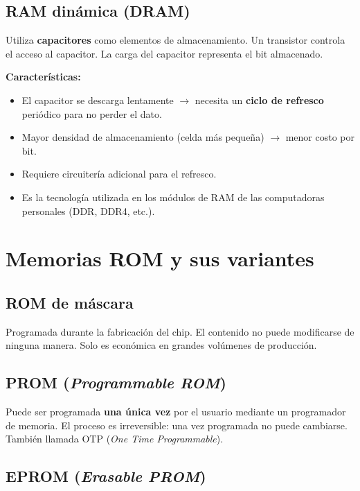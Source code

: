 \subsection{RAM dinámica (DRAM)}

Utiliza \textbf{capacitores} como elementos de almacenamiento. Un transistor controla el acceso al capacitor. La carga del capacitor representa el bit almacenado.


\textbf{Características:}
\begin{itemize}
  \item El capacitor se descarga lentamente $\rightarrow$ necesita un \textbf{ciclo de refresco} periódico para no perder el dato.
  \item Mayor densidad de almacenamiento (celda más pequeña) $\rightarrow$ menor costo por bit.
  \item Requiere circuitería adicional para el refresco.
  \item Es la tecnología utilizada en los módulos de RAM de las computadoras personales (DDR, DDR4, etc.).
\end{itemize}

\section{Memorias ROM y sus variantes}

\subsection{ROM de máscara}

Programada durante la fabricación del chip. El contenido no puede modificarse de ninguna manera. Solo es económica en grandes volúmenes de producción.

\subsection{PROM (\textit{Programmable ROM})}

Puede ser programada \textbf{una única vez} por el usuario mediante un programador de memoria. El proceso es irreversible: una vez programada no puede cambiarse. También llamada OTP (\textit{One Time Programmable}).

\subsection{EPROM (\textit{Erasable PROM})}

